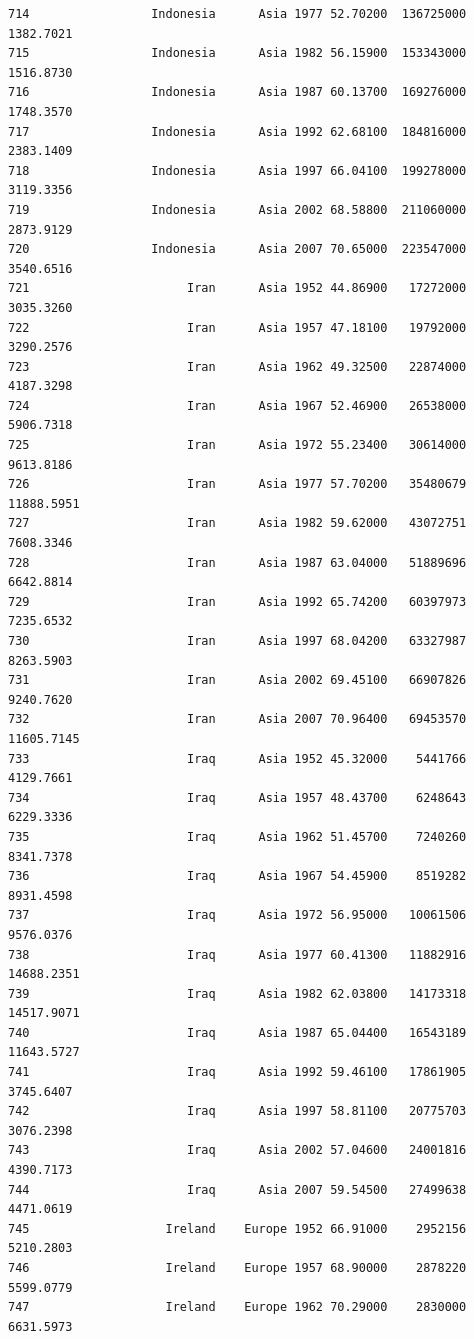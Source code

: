 \documentclass[
  letterpaper,
  DIV=11,
  numbers=noendperiod]{scrreprt}
\begin{document}
\begin{verbatim}
714                 Indonesia      Asia 1977 52.70200  136725000   1382.7021
715                 Indonesia      Asia 1982 56.15900  153343000   1516.8730
716                 Indonesia      Asia 1987 60.13700  169276000   1748.3570
717                 Indonesia      Asia 1992 62.68100  184816000   2383.1409
718                 Indonesia      Asia 1997 66.04100  199278000   3119.3356
719                 Indonesia      Asia 2002 68.58800  211060000   2873.9129
720                 Indonesia      Asia 2007 70.65000  223547000   3540.6516
721                      Iran      Asia 1952 44.86900   17272000   3035.3260
722                      Iran      Asia 1957 47.18100   19792000   3290.2576
723                      Iran      Asia 1962 49.32500   22874000   4187.3298
724                      Iran      Asia 1967 52.46900   26538000   5906.7318
725                      Iran      Asia 1972 55.23400   30614000   9613.8186
726                      Iran      Asia 1977 57.70200   35480679  11888.5951
727                      Iran      Asia 1982 59.62000   43072751   7608.3346
728                      Iran      Asia 1987 63.04000   51889696   6642.8814
729                      Iran      Asia 1992 65.74200   60397973   7235.6532
730                      Iran      Asia 1997 68.04200   63327987   8263.5903
731                      Iran      Asia 2002 69.45100   66907826   9240.7620
732                      Iran      Asia 2007 70.96400   69453570  11605.7145
733                      Iraq      Asia 1952 45.32000    5441766   4129.7661
734                      Iraq      Asia 1957 48.43700    6248643   6229.3336
735                      Iraq      Asia 1962 51.45700    7240260   8341.7378
736                      Iraq      Asia 1967 54.45900    8519282   8931.4598
737                      Iraq      Asia 1972 56.95000   10061506   9576.0376
738                      Iraq      Asia 1977 60.41300   11882916  14688.2351
739                      Iraq      Asia 1982 62.03800   14173318  14517.9071
740                      Iraq      Asia 1987 65.04400   16543189  11643.5727
741                      Iraq      Asia 1992 59.46100   17861905   3745.6407
742                      Iraq      Asia 1997 58.81100   20775703   3076.2398
743                      Iraq      Asia 2002 57.04600   24001816   4390.7173
744                      Iraq      Asia 2007 59.54500   27499638   4471.0619
745                   Ireland    Europe 1952 66.91000    2952156   5210.2803
746                   Ireland    Europe 1957 68.90000    2878220   5599.0779
747                   Ireland    Europe 1962 70.29000    2830000   6631.5973

\end{verbatim}
\end{document}
